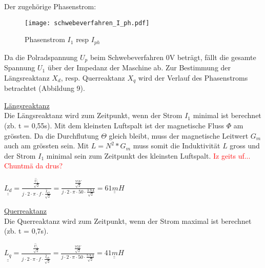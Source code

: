 \begin{flushleft}
\newpage

Der zugehörige Phasenstrom:\\
\vspace{0.3cm}
\begin{figure}[H]
    \centering
        \texttt{[image: schwebeverfahren\_I\_ph.pdf]}
    \caption{Phasenstrom $I_1$ resp $I_{ph}$}
    \label{fig:abb1}
\end{figure}


Da die Polradspannung $U_p$ beim Schwebeverfahren 0V beträgt, fällt die gesamte Spannung $U_1$ über der Impedanz der Maschine ab. 
Zur Bestimmung der Längsreaktanz $X_d$, resp. Querreaktanz $X_q$ wird der Verlauf des Phasenstroms betrachtet (Abbildung 9).\\
\vspace{0.4cm}

\underline{Längsreaktanz}\\
\vspace{0.2cm}
Die Längsreaktanz wird zum Zeitpunkt, wenn der Strom $I_1$ minimal ist  berechnet (zb. t = 0,55s). Mit dem kleinsten  Luftspalt ist der magnetische Fluss $\Phi$ am grössten. Da die Durchflutung $\Theta$ gleich bleibt, muss der magnetische Leitwert $G_m$ auch am grössten sein. Mit $L=N^2*G_m$ muss somit die Induktivität $L$ gross und der Strom $I_1$ minimal sein zum Zeitpunkt des kleinsten Luftspalt.
\textcolor{red}{Iz geits uf... Chuntmä da drus?}


\begin{center}
\begin{Large}
$ \underline{\underline{L_d}}= \frac{\frac{\hat{U}_1}{\sqrt{2}}}{j \cdot 2 \cdot \pi \cdot f \cdot \frac{\hat{I}_{ph}}{\sqrt{2}} }  = \frac{\frac{75 V}{\sqrt{2}}}{j \cdot 2 \cdot \pi \cdot 50 \cdot \frac{3.9 A}{\sqrt{2}} } = \underline{\underline{61 mH}}$\\
\end{Large}
\end{center}


\newpage




\underline{Querreaktanz}\\
\vspace{0.2cm}
Die Querreaktanz wird zum Zeitpunkt, wenn der Strom maximal ist  berechnet (zb. t = 0,7s). 

\begin{center}
\begin{Large}
$ \underline{\underline{L_q}}= \frac{\frac{\hat{U}_1}{\sqrt{2}}}{j \cdot 2 \cdot \pi \cdot f \cdot \frac{\hat{I}_{ph}}{\sqrt{2}} }  = \frac{\frac{75 V}{\sqrt{2}}}{j \cdot 2 \cdot \pi \cdot 50 \cdot \frac{5.8 A}{\sqrt{2}} } = \underline{\underline{41 mH}}$\\
\end{Large}
\end{center}



\end{flushleft}
